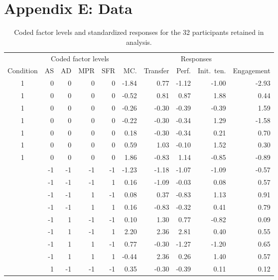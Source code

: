 \documentclass[12pt]{article}
\begin{document}
\section{Appendix E: Data}\label{d}
\begin{table}[H]
\centering
\begin{threeparttable}
\caption{Coded factor levels and standardized responses for the 32 participants
retained in analysis.}
\label{tab:design-responses}
\begin{tabular}{c rrrr rrrrr}
\toprule
 & \multicolumn{4}{c}{Coded factor levels} & \multicolumn{5}{c}{Responses} \\
\cmidrule(lr){2-5} \cmidrule(lr){6-10}
Condition & {AS} & {AD} & {MPR} & {SFR} & {MC.\tnote{a}} & {Transfer} & {Perf.} & {Init.\ ten.} & {Engagement\tnote{b}} \\
\midrule
1 & 0 & 0 & 0 & 0 & -1.84 & 0.77 & -1.12 & -1.00 & -2.93 \\
1 & 0 & 0 & 0 & 0 & -0.52 & 0.81 & 0.87 & 1.88 & 0.44 \\
1 & 0 & 0 & 0 & 0 & -0.26 & -0.30 & -0.39 & -0.39 & 1.59 \\
1 & 0 & 0 & 0 & 0 & -0.22 & -0.30 & -0.34 & 1.29 & -1.58 \\
1 & 0 & 0 & 0 & 0 & 0.18 & -0.30 & -0.34 & 0.21 & 0.70 \\
1 & 0 & 0 & 0 & 0 & 0.59 & 1.03 & -0.10 & 1.52 & 0.30 \\
1 & 0 & 0 & 0 & 0 & 1.86 & -0.83 & 1.14 & -0.85 & -0.89 \\
\addlinespace[2pt]
2 & -1 & -1 & -1 & -1 & -1.23 & -1.18 & -1.07 & -1.09 & -0.57 \\
\addlinespace[2pt]
3 & -1 & -1 & -1 & 1 & 0.16 & -1.09 & -0.03 & 0.08 & 0.57 \\
\addlinespace[2pt]
4 & -1 & -1 & 1 & -1 & 0.08 & 0.37 & -0.83 & 1.13 & 0.91 \\
\addlinespace[2pt]
5 & -1 & -1 & 1 & 1 & 0.16 & -0.83 & -0.32 & 0.41 & 0.79 \\
\addlinespace[2pt]
6 & -1 & 1 & -1 & -1 & 0.10 & 1.30 & 0.77 & -0.82 & 0.09 \\
\addlinespace[2pt]
7 & -1 & 1 & -1 & 1 & 2.20 & 2.36 & 2.81 & 0.40 & 0.55 \\
\addlinespace[2pt]
8 & -1 & 1 & 1 & -1 & 0.77 & -0.30 & -1.27 & -1.20 & 0.65 \\
\addlinespace[2pt]
9 & -1 & 1 & 1 & 1 & -0.44 & 2.36 & 0.26 & 1.40 & 0.57 \\
\addlinespace[2pt]
10 & 1 & -1 & -1 & -1 & 0.35 & -0.30 & -0.39 & 0.11 & 0.12 \\

\end{tabular}
\end{threeparttable}
\end{table}
\end{document}

